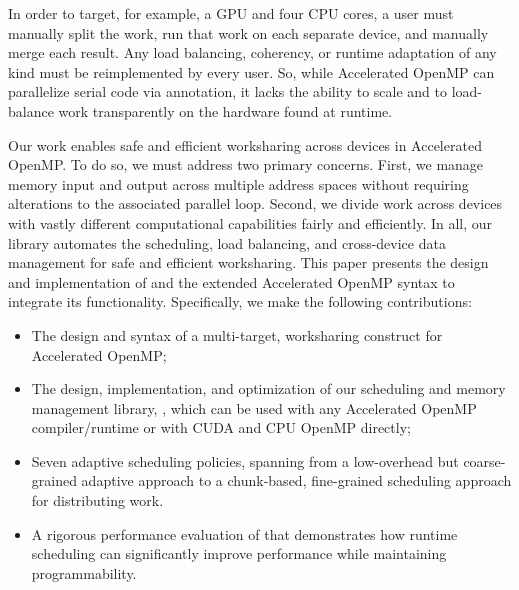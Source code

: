 In order to target, for example, a GPU and four CPU cores, a user must
manually split the work, run that work on each separate device, and
manually merge each result.  Any load balancing, coherency, or runtime
adaptation of any kind must be reimplemented by every user.  So,
while Accelerated OpenMP can parallelize serial code via annotation, it
lacks the ability to scale and to load-balance work transparently on the hardware
found at runtime.

Our work
enables safe and efficient worksharing across devices in
Accelerated OpenMP.
To do so, we must address two primary concerns. First, we
manage memory input and output across multiple address spaces without
requiring alterations to the associated parallel loop.  Second, we
divide work across devices with vastly different computational
capabilities fairly and efficiently.  In all, our \tsarlong library
automates the scheduling, load balancing, and cross-device data
management for safe and efficient
worksharing.
This paper presents the design and implementation of \tsar and the
extended Accelerated OpenMP syntax to integrate its functionality.
Specifically, we make the following contributions:

\begin{itemize}

    \item The design and syntax of a multi-target, worksharing
      construct for Accelerated OpenMP;

    \item The design, implementation, and optimization of our
      scheduling and memory management library, \tsar, which can be
      used with any Accelerated OpenMP compiler/runtime or with CUDA
      and CPU OpenMP directly;

    \item Seven adaptive scheduling policies, spanning from
      a low-overhead but
      coarse-grained adaptive approach
      to a chunk-based, fine-grained scheduling
      approach for distributing work.

    \item A rigorous performance evaluation of \tsar
      that demonstrates how runtime scheduling can significantly
      improve performance while maintaining programmability.

\end{itemize}

